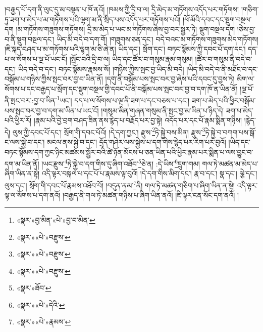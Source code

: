 །བརྒྱད་པོ་དག་ནི་ལུང་དུ་མ་བསྟན་པ་ཁོ་ནའོ། །ཁམས་ཀྱི་དྲི་བ་ལ། དྲི་མེད་མ་གཏོགས་འདོད་པར་གཏོགས། །གཅིག་ཏུ་ཟག་པ་མེད་པ་མ་གཏོགས་པའི་ལྷག་མ་ནི་སྲིད་པས་འདོད་པར་གཏོགས་པའོ། །ཕོ་མོའི་དབང་དང་སྡུག་བསྔལ་དག །མ་གཏོགས་གཟུགས་གཏོགས། དྲི་མ་མེད་པ་ཡང་མ་གཏོགས་ཞེས་བྱ་བར་སྦྱར་ཏེ། སྡུག་བསྔལ་དག །ཅེས་བྱ་བ་ནི་སྡུག་བསྔལ་དང་། ཡིད་མི་བདེ་བ་དག་གོ། །གཟུགས་ཅན་དང་། བདེ་བའང་མ་གཏོགས་གཟུགས་མེད་གཏོགས། །ཇི་སྐད་བཤད་པ་མ་གཏོགས་པའི་ལྷག་མ་ཅི་ཞེ་ན། ཡིད་དང་། སྲོག་དང་། བཏང་སྙོམས་ཀྱི་དབང་པོ་དག་དང་། དད་པ་ལ་སོགས་པ་ལྔ་པོ་ཡང་ངོ། །སྤོང་བའི་དྲི་བ་ལ། ཡིད་དང་ཚོར་བ་གསུམ་རྣམ་གསུམ། །ཚོར་བ་གསུམ་ནི་བདེ་བ་དང་། ཡིད་བདེ་བ་དང་། བཏང་སྙོམས་རྣམས་སོ། །གཉིས་ཀྱིས་སྤང་བྱ་ཡིད་མི་བདེ། །ཡིད་མི་བདེ་བ་ནི་མཐོང་བ་དང་བསྒོམ་པ་གཉིས་ཀྱིས་སྤང་བར་བྱ་བ་ཡིན་ནོ། །དགུ་ནི་བསྒོམ་པས་སྤང་བར་བྱ་ཞེས་པའི་དབང་དུ་བྱས་ཏེ། མིག་ལ་སོགས་པ་དང་བརྒྱད་པ་སྲོག་དང་སྡུག་བསྔལ་གྱི་དབང་པོ་ནི་བསྒོམ་པས་སྤང་བར་བྱ་བ་དག་ཁོ་ན་ཡིན་ནོ། །ལྔ་པོ་ནི་སྤང་བར་:བྱ་བ་ཡིན་\footnote{«སྣར་»བྱ་མིན་«པེ་»བྱ་བ་མིན་}ཡང་། དད་པ་ལ་སོགས་པ་ལྔ་ནི་ཟག་པ་དང་བཅས་པ་དང་། ཟག་པ་མེད་པའི་ཕྱིར་བསྒོམ་པས་སྤང་བར་བྱ་བ་དག་མ་ཡིན་པ་ཡང་ངོ། །གསུམ་མིན་གཞན་གསུམ་ནི་སྤང་བྱ་མ་ཡིན་པ་ཉིད་དེ། ཟག་པ་མེད་པའི་ཕྱིར་རོ། །རྣམ་པའི་བྱེ་བྲག་བཤད་ཟིན་ནས་རྙེད་པ་བརྗོད་པར་བྱ་སྟེ། འདོད་པར་དང་པོ་རྣམ་སྨིན་གཉིས། །རྙེད་དེ། ལུས་ཀྱི་དབང་པོ་དང་། སྲོག་གི་དབང་པོའོ། །དེ་དག་ཀྱང་། རྫུས་\footnote{«སྣར་»«པེ་»བརྫུས་}ཏེ་སྐྱེ་བས་མིན། རྫུས་\footnote{«སྣར་»«པེ་»བརྫུས་}ཏེ་སྐྱེ་བ་བཀག་པས་སྒོ་ང་ལས་སྐྱེ་བ་དང་། མངལ་ནས་སྐྱེ་བ་དང་། དྲོད་གཤེར་ལས་སྐྱེས་པ་དག་གིས་རྙེད་པར་རིག་པར་བྱའོ། །ཡིད་དང་བཏང་སྙོམས་དག་ཀྱང་ཉིང་མཚམས་སྦྱོར་བའི་ཚེ་ཉོན་མོངས་པ་ཅན་ཡིན་པའི་ཕྱིར་རྣམ་པར་སྨིན་པ་ལས་བྱུང་བ་དག་མ་ཡིན་ནོ། །ཡང་རྫུས་\footnote{«སྣར་»«པེ་»བརྫུས་}ཏེ་སྐྱེ་བ་དག་གིས་དུ་ཞིག་འཐོབ་\footnote{«སྣར་»ཐོབ་}ཅེ་ན། :དེ་ཡིས་\footnote{«སྣར་»«པེ་»དེའི་}དྲུག་གམ། གལ་ཏེ་མཚན་མ་མེད་པ་ཞིག་ཡིན་ན་སྟེ། འདི་ལྟར་བསྐལ་པ་དང་པོ་པ་རྣམས་ལྟ་བུའོ། །དེ་དག་གིས་མིག་དང་། རྣ་བ་དང་། སྣ་དང་། ལྕེ་དང་། ལུས་དང་། སྲོག་གི་དབང་པོ་རྣམས་འཐོབ་བོ། །བདུན་ནམ་\footnote{«སྣར་»«པེ་»རྣམས་}ནི། གལ་ཏེ་མཚན་གཅིག་པ་ཞིག་ཡིན་ན་སྟེ། འདི་ལྟར་ལྟ་ལ་སོགས་པ་དག་ནའོ། །བརྒྱད་ནི་གལ་ཏེ་མཚན་གཉིས་པ་ཞིག་ཡིན་ནའོ། །ཇི་ལྟར་ངན་སོང་དག་ནའོ། །
